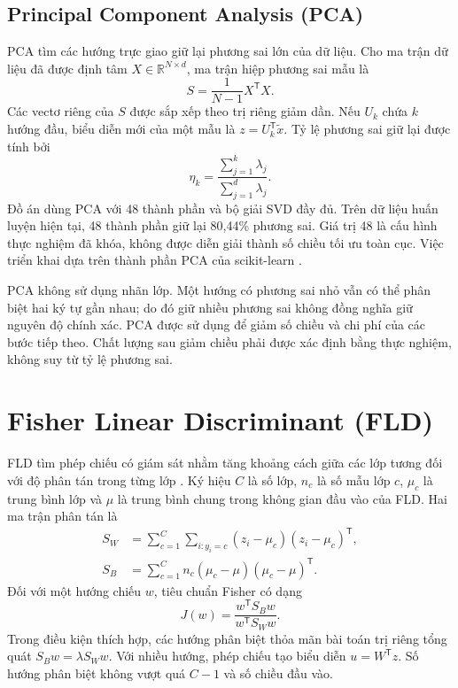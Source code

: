 \subsection{Principal Component Analysis (PCA)}
PCA tìm các hướng trực giao giữ lại phương sai lớn của dữ liệu. Cho ma trận dữ liệu đã được định tâm $X\in\mathbb{R}^{N\times d}$, ma trận hiệp phương sai mẫu là
\begin{equation}
S=\frac{1}{N-1}X^\mathsf{T}X.
\end{equation}
Các vectơ riêng của $S$ được sắp xếp theo trị riêng giảm dần. Nếu $U_k$ chứa $k$ hướng đầu, biểu diễn mới của một mẫu là $z=U_k^\mathsf{T}\widetilde{x}$. Tỷ lệ phương sai giữ lại được tính bởi
\begin{equation}
\eta_k=\frac{\sum_{j=1}^{k}\lambda_j}{\sum_{j=1}^{d}\lambda_j}.
\end{equation}
Đồ án dùng PCA với 48 thành phần và bộ giải SVD đầy đủ. Trên dữ liệu huấn luyện hiện tại, 48 thành phần giữ lại 80,44\% phương sai. Giá trị 48 là cấu hình thực nghiệm đã khóa, không được diễn giải thành số chiều tối ưu toàn cục. Việc triển khai dựa trên thành phần PCA của scikit-learn \cite{skpca}.

PCA không sử dụng nhãn lớp. Một hướng có phương sai nhỏ vẫn có thể phân biệt hai ký tự gần nhau; do đó giữ nhiều phương sai không đồng nghĩa giữ nguyên độ chính xác. PCA được sử dụng để giảm số chiều và chi phí của các bước tiếp theo. Chất lượng sau giảm chiều phải được xác định bằng thực nghiệm, không suy từ tỷ lệ phương sai.

\section{Fisher Linear Discriminant (FLD)}
FLD tìm phép chiếu có giám sát nhằm tăng khoảng cách giữa các lớp tương đối với độ phân tán trong từng lớp \cite{fisher}. Ký hiệu $C$ là số lớp, $n_c$ là số mẫu lớp $c$, $\mu_c$ là trung bình lớp và $\mu$ là trung bình chung trong không gian đầu vào của FLD. Hai ma trận phân tán là
\begin{align}
S_W&=\sum_{c=1}^{C}\sum_{i:y_i=c}(z_i-\mu_c)(z_i-\mu_c)^\mathsf{T},\\
S_B&=\sum_{c=1}^{C}n_c(\mu_c-\mu)(\mu_c-\mu)^\mathsf{T}.
\end{align}
Đối với một hướng chiếu $w$, tiêu chuẩn Fisher có dạng
\begin{equation}
J(w)=\frac{w^\mathsf{T}S_Bw}{w^\mathsf{T}S_Ww}.
\end{equation}
Trong điều kiện thích hợp, các hướng phân biệt thỏa mãn bài toán trị riêng tổng quát $S_Bw=\lambda S_Ww$. Với nhiều hướng, phép chiếu tạo biểu diễn $u=W^\mathsf{T}z$. Số hướng phân biệt không vượt quá $C-1$ và số chiều đầu vào.

